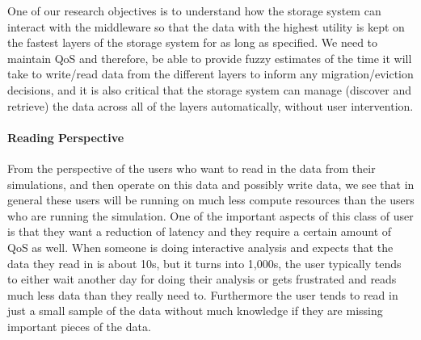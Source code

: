 One of our  research objectives is to understand how the
storage system can interact with the middleware   so
that the data with the highest utility is kept on the fastest layers of the
storage system for as long as specified. We need to maintain 
QoS and therefore, be able to provide fuzzy estimates of the time it will take to write/read data from
the different layers to inform any migration/eviction decisions, and it
is also critical that the storage system can manage (discover and retrieve) the data across all of the
layers automatically, without user intervention. 


\paragraph{Reading  Perspective}
\label{subsec:reading-perspective}
From the perspective of the users who want to read in the data from their
simulations, and then operate on this data and possibly write data, we see
that in general these users will be running on much less compute resources
than the users who are running the simulation. One of the important aspects
of this class of user is that they want a reduction of latency and they
require a certain amount of QoS as well. When someone is
doing interactive analysis and expects that the data they read in is about
10s, but it turns into 1,000s, the user typically tends to either wait
another day for doing their analysis or gets frustrated and reads much less
data than they really need to. Furthermore the user tends to read in just a
small sample of the data without much knowledge if they are missing
important pieces of the data.


